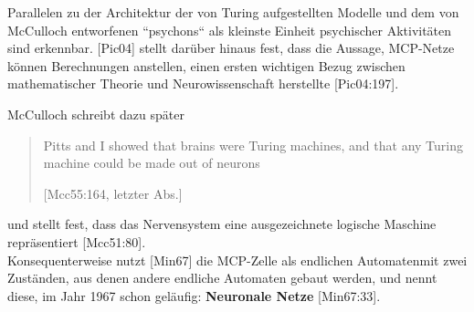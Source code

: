 \noindent
Parallelen zu der Architektur der von Turing aufgestellten Modelle und dem von McCulloch entworfenen ``psychons`` als kleinste Einheit psychischer Aktivitäten sind erkennbar. [Pic04] stellt darüber hinaus fest, dass die Aussage, MCP-Netze können Berechnungen anstellen, einen ersten wichtigen Bezug zwischen mathematischer Theorie und Neurowissenschaft herstellte [Pic04:197].

\noindent
McCulloch schreibt dazu später

\blockquote[{[Mcc55:164, letzter Abs.]}]{
Pitts and I showed that brains were Turing machines, and that any Turing machine could be made out of neurons
}

\noindent
und stellt fest, dass das Nervensystem eine ausgezeichnete logische Maschine repräsentiert [Mcc51:80].\\

\noindent
Konsequenterweise nutzt [Min67] die MCP-Zelle als endlichen Automaten\footnotemark[26]\footnotemark[27] mit zwei Zuständen, aus denen andere endliche Automaten gebaut werden, und nennt diese, im Jahr 1967 schon geläufig: \textbf{Neuronale Netze} [Min67:33].









